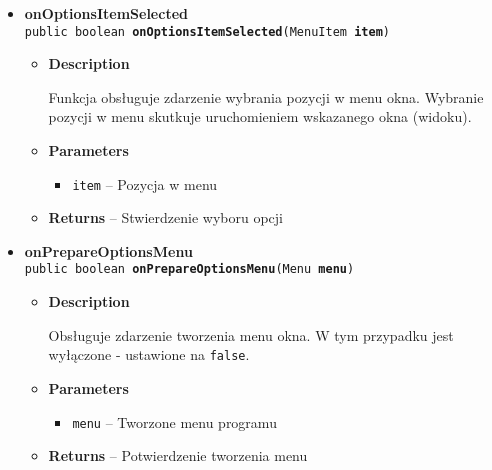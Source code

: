 \documentclass[11pt,a4paper]{article}
\begin{document}
{{{\begin{itemize}
{\begin{itemize}
{Dodaje do menu okna opcje menu.
}
\item{
{\bf  Parameters}
  \begin{itemize}
   \item{
\texttt{menu} -- Tworzone menu programu}
  \end{itemize}
}%
\item{{\bf  Returns} -- 
Stan tworzenia opcji menu 
}%
\end{itemize}
}%
\item{ 
\hypertarget{com.example.kostkadogry.About.onOptionsItemSelected(MenuItem)}{{\bf  onOptionsItemSelected}\\}
\texttt{public boolean\ {\bf  onOptionsItemSelected}(\texttt{MenuItem} {\bf  item})
\label{com.example.kostkadogry.About.onOptionsItemSelected(MenuItem)}}%
\begin{itemize}
\item{
{\bf  Description}

Funkcja obsługuje zdarzenie wybrania pozycji w menu okna. Wybranie pozycji w menu skutkuje uruchomieniem wskazanego okna (widoku).
}
\item{
{\bf  Parameters}
  \begin{itemize}
   \item{
\texttt{item} -- Pozycja w menu}
  \end{itemize}
}%
\item{{\bf  Returns} -- 
Stwierdzenie wyboru opcji 
}%
\end{itemize}
}%
\item{ 
\hypertarget{com.example.kostkadogry.About.onPrepareOptionsMenu(Menu)}{{\bf  onPrepareOptionsMenu}\\}
\texttt{public boolean\ {\bf  onPrepareOptionsMenu}(\texttt{Menu} {\bf  menu})
\label{com.example.kostkadogry.About.onPrepareOptionsMenu(Menu)}}%
\begin{itemize}
\item{
{\bf  Description}

Obsługuje zdarzenie tworzenia menu okna. W tym przypadku jest wyłączone - ustawione na \texttt{\small false}.
}
\item{
{\bf  Parameters}
  \begin{itemize}
   \item{
\texttt{menu} -- Tworzone menu programu}
  \end{itemize}
}%
\item{{\bf  Returns} -- 
Potwierdzenie tworzenia menu 
}%
\end{itemize}
}%
\end{itemize}
}
}
}
\end{document}
